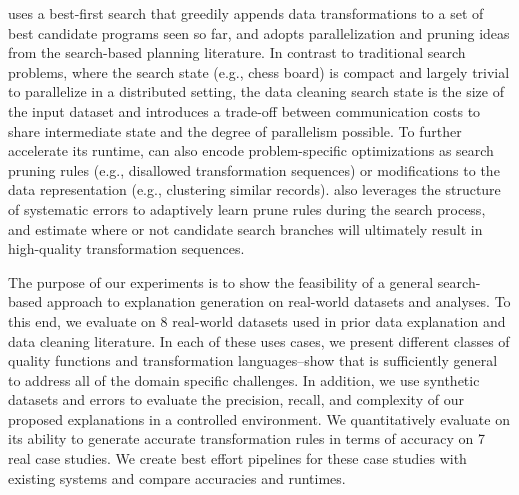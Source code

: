 \sys uses a best-first search that greedily appends data transformations to a set of best candidate programs seen so far, and adopts parallelization and pruning ideas from the search-based planning literature.  
In contrast to traditional search problems, where the search state (e.g., chess board) is compact and largely trivial to parallelize in a distributed setting, the data cleaning search state is the size of the input dataset and introduces a trade-off between communication costs to share intermediate state and the degree of parallelism possible.  
 To further accelerate its runtime, \sys can also encode problem-specific optimizations as search pruning rules (e.g., disallowed transformation sequences) or modifications to the data representation (e.g., clustering similar records).  
\sys also leverages the structure of systematic errors to adaptively learn prune rules during the search process, and estimate where or not candidate search branches will ultimately result in high-quality transformation sequences.  
 
The purpose of our experiments is to show the feasibility of a general search-based approach to explanation generation on real-world datasets and analyses.  To this end, we evaluate \sys on 8 real-world datasets used in prior data explanation and data cleaning literature. In each of these uses cases, we present different classes of quality functions and transformation languages--show that \sys is sufficiently general to address all of the domain specific challenges. 
In addition, we use synthetic datasets and errors to evaluate the precision, recall, and complexity of our proposed explanations in a controlled environment.  
We quantitatively evaluate \sys on its ability to generate accurate transformation rules in terms of accuracy on 7 real case studies. We create best effort pipelines for these case studies with existing systems and compare accuracies and runtimes.












